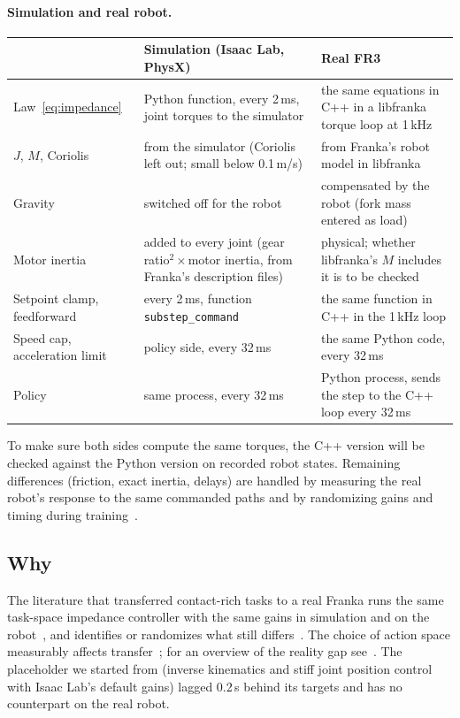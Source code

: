\paragraph{Simulation and real robot.}
\begin{center}
\begin{tabular}{p{}p{}p{}}
  \toprule
  & Simulation (Isaac Lab, PhysX) & Real FR3 \\
  \midrule
  Law~\eqref{eq:impedance} & Python function, every 2\,ms, joint torques to the simulator
    & the same equations in C++ in a libfranka torque loop at 1\,kHz \\
  $J$, $M$, Coriolis & from the simulator (Coriolis left out; small below 0.1\,m/s)
    & from Franka's robot model in libfranka \\
  Gravity & switched off for the robot & compensated by the robot (fork mass entered as load) \\
  Motor inertia & added to every joint (gear ratio$^2\times$motor inertia, from Franka's description files)
    & physical; whether libfranka's $M$ includes it is to be checked \\
  Setpoint clamp, feedforward & every 2\,ms, function \texttt{substep\_command} & the same function in C++ in the 1\,kHz loop \\
  Speed cap, acceleration limit & policy side, every 32\,ms & the same Python code, every 32\,ms \\
  Policy & same process, every 32\,ms & Python process, sends the step to the C++ loop every 32\,ms \\
  \bottomrule
\end{tabular}
\end{center}
To make sure both sides compute the same torques, the C++ version will be checked against the Python version on
recorded robot states. Remaining differences (friction, exact inertia, delays) are handled by measuring the real
robot's response to the same commanded paths and by randomizing gains and timing during
training~\cite{peng2018sim,frankatwin}.

\subsection{Why}

The literature that transferred contact-rich tasks to a real Franka runs the same task-space impedance
controller with the same gains in simulation and on the robot~\cite{tang2023industreal,frankatwin,kaspar2020sim2real},
and identifies or randomizes what still differs~\cite{peng2018sim}. The choice of action space measurably affects
transfer~\cite{aljalbout2024action}; for an overview of the reality gap see~\cite{aljalbout2026realitygap}.
The placeholder we started from (inverse kinematics and stiff joint position control with Isaac Lab's default gains)
lagged 0.2\,s behind its targets and has no counterpart on the real robot.

